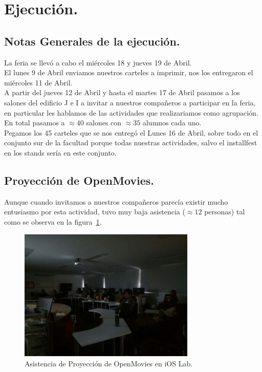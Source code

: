 \documentclass[a4paper,11pt]{article}                 %
\begin{document}
    \section{Ejecución.}
   \subsection{Notas Generales de la ejecución.}
  La feria se llevó a cabo el miércoles 18 y jueves 19 de Abril.\\  El lunes 9 de Abril enviamos nuestros carteles a imprimir, nos los entregaron el miércoles 11 de Abril.\\  A partir del jueves 12 de Abril y hasta el martes 17 de Abril pasamos a los salones del edificio J e I a invitar a nuestros compañeros a participar en la feria, en particular les hablamos de las actividades que realizariamos como agrupación. En total pasamos a $\approx 40$ salones con $\approx 35$ alumnos cada uno.\\  Pegamos los 45 carteles que se nos entregó el Lunes 16 de Abril, sobre todo en el conjunto sur de la facultad porque todas nuestras actividades, salvo el installfest en los stands sería en este conjunto.
  \subsection{Proyección de OpenMovies.} 
  Aunque cuando invitamos a nuestros compañeros parecía existir mucho entusiasmo por esta actividad, tuvo muy baja asistencia ($ \approx 12$ personas) tal como se observa en la figura~\ref{fig:openmovies-01}.
  \begin{figure}[H]
    \begin{center}
      \includegraphics[width=0.75\textwidth]{images/openmovies-01}
      \caption{Asistencia de Proyección de OpenMovies en iOS Lab.}
      \label{fig:openmovies-01}
    \end{center}
  \end{figure}
  
\end{document}
